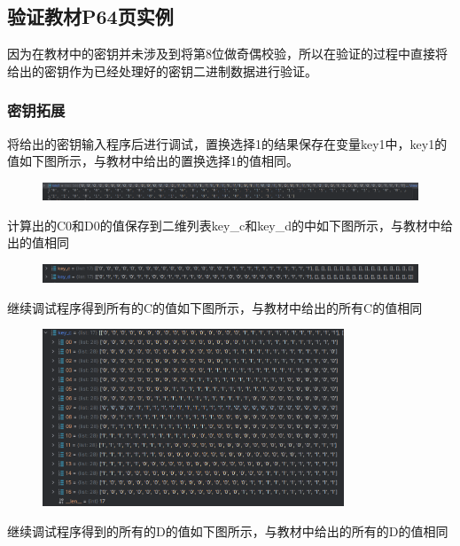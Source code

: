 \documentclass[a4paper,11pt,UTF8]{ctexart}
\newcommand{\bottomcaption}{%
\setlength{\abovecaptionskip}{6pt}%
\setlength{\belowcaptionskip}{6pt}%
\caption}
\newcommand{\xiaowuhao}{\fontsize{9pt}{\baselineskip}\selectfont}   %
\begin{document}
    \subsection{验证教材P64页实例}
        因为在教材中的密钥并未涉及到将第8位做奇偶校验，所以在验证的过程中直接将给出的密钥作为已经处理好的密钥二进制数据进行验证。
        \subsubsection{密钥拓展}
            将给出的密钥输入程序后进行调试，置换选择1的结果保存在变量key1中，key1的值如下图所示，与教材中给出的置换选择1的值相同。\par
            \begin{figure}[H]
                \centering
                \includegraphics[width=15cm]{置换选择1.png}
                \bottomcaption{\xiaowuhao{置换选择1的结果}}
            \end{figure}
\newpage
            计算出的C0和D0的值保存到二维列表key\_c和key\_d的中如下图所示，与教材中给出的值相同
            \begin{figure}[H]
                \centering
                \includegraphics[width=15cm]{C0D0.png}
                \bottomcaption{\xiaowuhao{计算得到的C0和D0的结果}}
            \end{figure}
            继续调试程序得到所有的C的值如下图所示，与教材中给出的所有C的值相同
            \begin{figure}[H]
                \centering
                \includegraphics[width=9cm]{key_c.png}
                \bottomcaption{\xiaowuhao{调试程序得到所有的C的值}}
            \end{figure}
            继续调试程序得到的所有的D的值如下图所示，与教材中给出的所有的D的值相同
\end{document}
